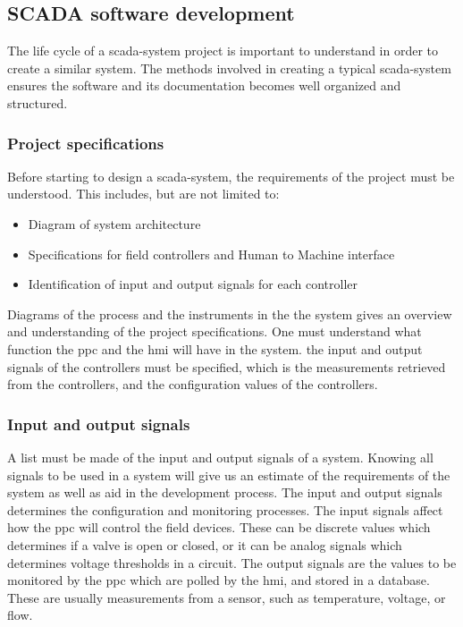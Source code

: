 \documentclass[main.tex]{subfiles}
\begin{document}
\subsection{SCADA software development}

The life cycle of a \gls{scada}-system project is important to understand in order to create a similar system. The methods involved in creating a typical \gls{scada}-system ensures the software and its documentation becomes well organized and structured.

\subsubsection{Project specifications}

Before starting to design a \gls{scada}-system, the requirements of the project must be understood. This includes, but are not limited to\cite{scada_design}:

\begin{itemize}
    \item Diagram of system architecture
    \item Specifications for field controllers and Human to Machine interface
    \item Identification of input and output signals for each controller

\end{itemize}

 Diagrams of the process and the instruments in the the system gives an overview and understanding of the project specifications. One must understand what function the \gls{ppc} and the \gls{hmi} will have in the system.  the input and output signals of the controllers must be specified, which is the measurements retrieved from the controllers, and the configuration values of the controllers.

\subsubsection{Input and output signals}

A list must be made of the input and output signals of a system. Knowing all signals to be used in a system will give us an estimate of the requirements of the system as well as aid in the development process. 
The input and output signals determines the configuration and monitoring processes. The input signals affect how the \gls{ppc} will control the field devices. These can be discrete values which determines if a valve is open or closed, or it can be analog signals which determines voltage thresholds in a circuit. The output signals are the values to be monitored by the \gls{ppc} which are polled by the \gls{hmi}, and stored in a database. These are usually measurements from a sensor, such as temperature, voltage, or flow.
\end{document}
